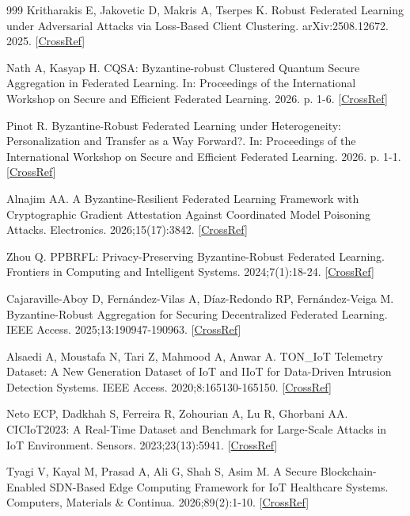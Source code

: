 \documentclass[cmc,article,submit,moreauthors,pdftex]{Definitions/tsp}
\begin{document}
\begin{thebibliography}{999}
Kritharakis E, Jakovetic D, Makris A, Tserpes K. Robust Federated Learning under Adversarial Attacks via Loss-Based Client Clustering. arXiv:2508.12672. 2025. [\href{https://doi.org/10.48550/arXiv.2508.12672}{CrossRef}]

Nath A, Kasyap H. CQSA: Byzantine-robust Clustered Quantum Secure Aggregation in Federated Learning. In: Proceedings of the International Workshop on Secure and Efficient Federated Learning. 2026. p. 1-6. [\href{https://doi.org/10.1145/3803630.3809169}{CrossRef}]

Pinot R. Byzantine-Robust Federated Learning under Heterogeneity: Personalization and Transfer as a Way Forward?. In: Proceedings of the International Workshop on Secure and Efficient Federated Learning. 2026. p. 1-1. [\href{https://doi.org/10.1145/3803630.3809173}{CrossRef}]

Alnajim AA. A Byzantine-Resilient Federated Learning Framework with Cryptographic Gradient Attestation Against Coordinated Model Poisoning Attacks. Electronics. 2026;15(17):3842. [\href{https://doi.org/10.3390/electronics15173842}{CrossRef}]

Zhou Q. PPBRFL: Privacy-Preserving Byzantine-Robust Federated Learning. Frontiers in Computing and Intelligent Systems. 2024;7(1):18-24. [\href{https://doi.org/10.54097/6jamgy43}{CrossRef}]

Cajaraville-Aboy D, Fernández-Vilas A, Díaz-Redondo RP, Fernández-Veiga M. Byzantine-Robust Aggregation for Securing Decentralized Federated Learning. IEEE Access. 2025;13:190947-190963. [\href{https://doi.org/10.1109/access.2025.3629864}{CrossRef}]

Alsaedi A, Moustafa N, Tari Z, Mahmood A, Anwar A. TON\_IoT Telemetry Dataset: A New Generation Dataset of IoT and IIoT for Data-Driven Intrusion Detection Systems. IEEE Access. 2020;8:165130-165150. [\href{https://doi.org/10.1109/access.2020.3022862}{CrossRef}]

Neto ECP, Dadkhah S, Ferreira R, Zohourian A, Lu R, Ghorbani AA. CICIoT2023: A Real-Time Dataset and Benchmark for Large-Scale Attacks in IoT Environment. Sensors. 2023;23(13):5941. [\href{https://doi.org/10.3390/s23135941}{CrossRef}]

Tyagi V, Kayal M, Prasad A, Ali G, Shah S, Asim M. A Secure Blockchain-Enabled SDN-Based Edge Computing Framework for IoT Healthcare Systems. Computers, Materials \& Continua. 2026;89(2):1-10. [\href{https://doi.org/10.32604/cmc.2026.085763}{CrossRef}]


\end{thebibliography}
\end{document}
